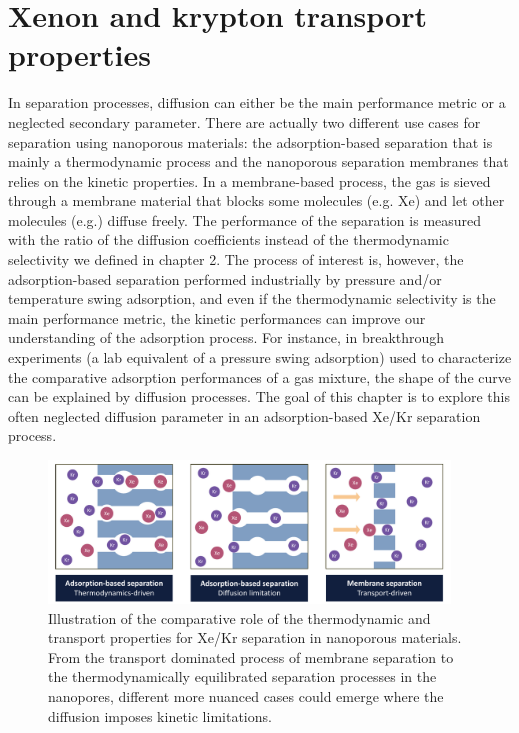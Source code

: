 \documentclass[main]{subfiles}
\begin{document}
\chapter{Xenon and krypton transport properties}
\vspace*{-1\baselineskip}


In separation processes, diffusion can either be the main performance metric or a neglected secondary parameter. There are actually two different use cases for separation using nanoporous materials: the adsorption-based separation that is mainly a thermodynamic process and the nanoporous separation membranes that relies on the kinetic properties. In a membrane-based process, the gas is sieved through a membrane material that blocks some molecules (e.g. Xe) and let other molecules (e.g.) diffuse freely. The performance of the separation is measured with the ratio of the diffusion coefficients instead of the thermodynamic selectivity we defined in chapter 2. The process of interest is, however, the adsorption-based separation performed industrially by pressure and/or temperature swing adsorption, and even if the thermodynamic selectivity is the main performance metric, the kinetic performances can improve our understanding of the adsorption process. For instance, in breakthrough experiments (a lab equivalent of a pressure swing adsorption) used to characterize the comparative adsorption performances of a gas mixture, the shape of the curve can be explained by diffusion processes. The goal of this chapter is to explore this often neglected diffusion parameter in an adsorption-based Xe/Kr separation process.

\begin{figure}[ht]
  \centering
    \includegraphics[width=0.95\textwidth]{figures/5-diffusion/Diffusion.pdf}
    \caption{Illustration of the comparative role of the thermodynamic and transport properties for Xe/Kr separation in nanoporous materials. From the transport dominated process of membrane separation to the thermodynamically equilibrated separation processes in the nanopores, different more nuanced cases could emerge where the diffusion imposes kinetic limitations. }
    \label{fgr:intro_diffusion}
\end{figure}
\end{document}
